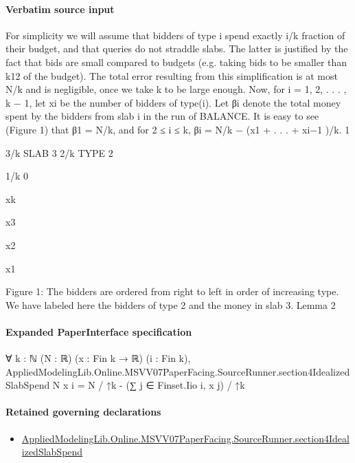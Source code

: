 \documentclass[10pt]{article}
\begin{document}
\paragraph{Verbatim source input}
\begin{ReviewVerbatim}
For simplicity we will assume that bidders of type i spend exactly i/k fraction of their budget,
and that queries do not straddle slabs. The latter is justified by the fact that bids are small
compared to budgets (e.g. taking bids to be smaller than k12 of the budget). The total error
resulting from this simplification is at most N/k and is negligible, once we take k to be large
enough. Now, for i = 1, 2, . . . , k − 1, let xi be the number of bidders of type(i). Let βi denote
the total money spent by the bidders from slab i in the run of BALANCE. It is easy to see
(Figure 1) that β1 = N/k, and for 2 ≤ i ≤ k, βi = N/k − (x1 + . . . + xi−1 )/k.
1

3/k
SLAB 3
2/k
TYPE 2

1/k
0

xk

x3

x2

x1

Figure 1: The bidders are ordered from right to left in order of increasing type. We have labeled here
the bidders of type 2 and the money in slab 3.
Lemma 2
\end{ReviewVerbatim}



\paragraph{Expanded PaperInterface specification}
\begin{ReviewVerbatim}
∀ {k : ℕ} (N : ℝ) (x : Fin k → ℝ) (i : Fin k),
  AppliedModelingLib.Online.MSVV07PaperFacing.SourceRunner.section4IdealizedSlabSpend N x i =
    N / ↑k - (∑ j ∈ Finset.Iio i, x j) / ↑k
\end{ReviewVerbatim}

\paragraph{Retained governing declarations}
\begin{itemize}\raggedright
\item \hyperlink{governing-declaration-551dcb1f40ef38c5}{Applied\allowbreak{}Modeling\allowbreak{}Lib.\allowbreak{}Online.\allowbreak{}MSVV07\allowbreak{}Paper\allowbreak{}Facing.\allowbreak{}Source\allowbreak{}Runner.\allowbreak{}section4\allowbreak{}Idealized\allowbreak{}Slab\allowbreak{}Spend}
\end{itemize}
\end{document}
